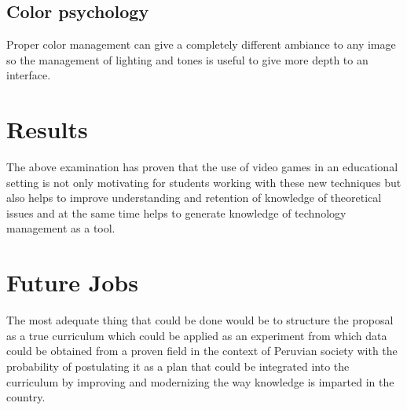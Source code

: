 \documentclass[conference, letterpaper]{IEEEtran}
\begin{document}
\subsection{Color psychology}
Proper color management can give a completely different ambiance to any image so the management of lighting and tones is useful to give more depth to an interface.


\section{Results}
The above examination has proven that the use of video games in an educational setting is not only motivating for students working with these new techniques but also helps to improve understanding and retention of knowledge of theoretical issues and at the same time helps to generate knowledge of technology management as a tool.

\section{Future Jobs}
The most adequate thing that could be done would be to structure the proposal as a true curriculum which could be applied as an experiment from which data could be obtained from a proven field in the context of Peruvian society with the probability of postulating it as a plan that could be integrated into the curriculum by improving and modernizing the way knowledge is imparted in the country. 




%
%
\end{document}
